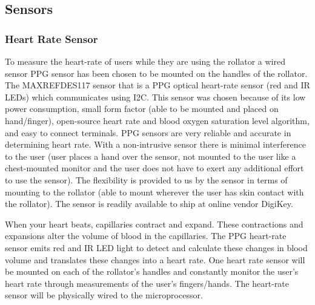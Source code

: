 \documentclass{article}
\begin{document}
\subsection{Sensors}
\subsubsection{Heart Rate Sensor}
To measure the heart-rate of users while they are using the rollator a wired sensor PPG sensor has been chosen to be mounted on the handles of the rollator.
The MAXREFDES117 sensor that is a PPG optical heart-rate sensor (red and IR LEDs) which communicates using I2C. This sensor was chosen because of its low power consumption, small form factor (able to be mounted and placed on hand/finger), open-source heart rate and blood oxygen saturation level algorithm, and easy to connect terminals. PPG sensors are very reliable and accurate in determining heart rate. With a non-intrusive sensor there is minimal interference to the user (user places a hand over the sensor, not mounted to the user like a chest-mounted monitor and the user does not have to exert any additional effort to use the sensor). The flexibility is provided to us by the sensor in terms of mounting to the rollator (able to mount wherever the user has skin contact with the rollator). The sensor is readily available to ship at online vendor DigiKey.

When your heart beats, capillaries contract and expand. These contractions and expansions alter the volume of blood in the capillaries. The PPG heart-rate sensor emits red and IR LED light to detect and calculate these changes in blood volume and translates these changes into a heart rate. One heart rate sensor will be mounted on each of the rollator’s handles and constantly monitor the user’s heart rate through measurements of the user’s fingers/hands. The heart-rate sensor will be physically wired to the microprocessor.
\end{document}
